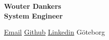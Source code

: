 \Huge\bfseries {\color{RoyalBlue} Wouter Dankers} \\
\Large\bfseries  System Engineer
\SmallSep

\normalsize\normalfont

\faEnvelope \vspace{5pt} \href{mailto:wouter.dankers@skynet.be}{Email} \hfill \faGithub \vspace{5pt} \href{http://www.github.com/DankersW}{Github} \hfill \faLinkedin \vspace{5pt} \href{http://www.linkedin.com/in/wouter-dankers}{Linkedin} \hfill \faHome \vspace{5pt} G\"oteborg \hfil
